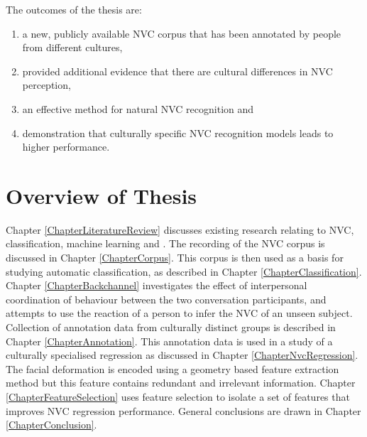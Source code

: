 The outcomes of the thesis are:

\begin{enumerate}
 \item a new, publicly available \ac{NVC} corpus that has been annotated by people from different cultures,
 \item provided additional evidence that there are cultural differences in \ac{NVC} perception, 
 \item an effective method for natural \ac{NVC} recognition and
 \item demonstration that culturally specific \ac{NVC} recognition models leads to higher performance.
\end{enumerate}

\section{Overview of Thesis}

Chapter \ref{ChapterLiteratureReview} discusses existing research relating to \ac{NVC}, classification, machine learning and \featureGeneration. The recording of the \ac{NVC} corpus is discussed in Chapter \ref{ChapterCorpus}. This corpus is then used as a basis for studying automatic classification, as described in Chapter \ref{ChapterClassification}. Chapter \ref{ChapterBackchannel} investigates the effect of interpersonal coordination of behaviour between the two conversation participants, and attempts to use the reaction of a person to infer the \ac{NVC} of an unseen subject. Collection of annotation data from culturally distinct groups is described in Chapter \ref{ChapterAnnotation}. This annotation data is used in a study of a culturally specialised regression as discussed in Chapter \ref{ChapterNvcRegression}. The facial deformation is encoded using a geometry based feature extraction method but this feature contains redundant and irrelevant information. Chapter \ref{ChapterFeatureSelection} uses feature selection to isolate a set of features that improves \ac{NVC} regression performance. General conclusions are drawn in Chapter \ref{ChapterConclusion}.

